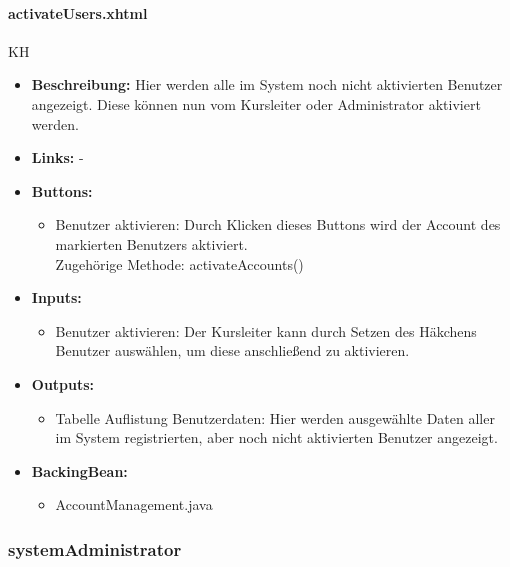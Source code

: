 				\paragraph{activateUsers.xhtml}
					KH\\
					\begin{itemize}
						\item \textbf{Beschreibung:} Hier werden alle im System noch nicht aktivierten Benutzer angezeigt. Diese können nun vom Kursleiter oder Administrator aktiviert werden. 
						\item \textbf{Links:} -
						\item \textbf{Buttons:}
							\begin{itemize}
								\item Benutzer aktivieren: Durch Klicken dieses Buttons wird der Account des markierten Benutzers aktiviert. \\ Zugehörige Methode: activateAccounts()
							\end{itemize}
						\item \textbf{Inputs:}
							\begin{itemize}
								\item Benutzer aktivieren: Der Kursleiter kann durch Setzen des Häkchens Benutzer auswählen, um diese anschließend zu aktivieren.
							\end{itemize}
						\item \textbf{Outputs:}
							\begin{itemize}
								\item Tabelle Auflistung Benutzerdaten: Hier werden ausgewählte Daten aller im System registrierten, aber noch nicht aktivierten Benutzer angezeigt.
							\end{itemize}
						\item \textbf{BackingBean:}
							\begin{itemize}
								\item AccountManagement.java
							\end{itemize}
					\end{itemize}
			
			\subsubsection{systemAdministrator}
			
